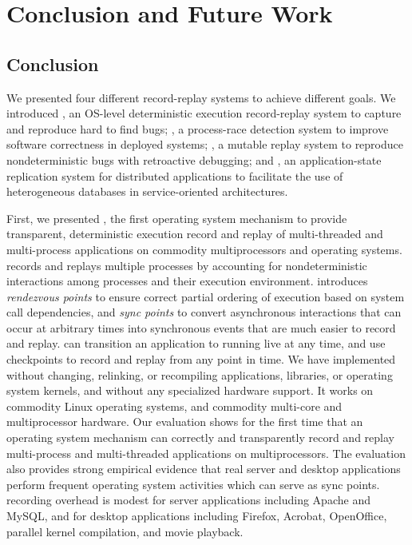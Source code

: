 \chapter{Conclusion and Future Work}
\label{ch:conclusion}

\section{Conclusion}

We presented four different record-replay systems to achieve different goals.
We introduced \scribe, an OS-level deterministic execution record-replay system
to capture and reproduce hard to find bugs; \racepro, a process-race detection
system to improve software correctness in deployed systems; \dora, a mutable
replay system to reproduce nondeterministic bugs with retroactive debugging;
and \synapse, an application-state replication system for distributed
applications to facilitate the use of heterogeneous databases in
service-oriented architectures.

First, we presented \scribe{}, the first operating system mechanism to provide
transparent, deterministic execution record and replay of multi-threaded and
multi-process applications on commodity multiprocessors and operating systems.
\scribe{} records and replays multiple processes by accounting for
nondeterministic interactions among processes and their execution environment.
\scribe{} introduces {\em rendezvous points} to ensure correct partial ordering
of execution based on system call dependencies, and {\em sync points} to convert
asynchronous interactions that can occur at arbitrary times into synchronous
events that are much easier to record and replay.  \scribe{} can transition an
application  to running live at any time, and use checkpoints to record and
replay from any point in time.
We have implemented \scribe{} without changing, relinking, or
recompiling applications, libraries, or operating system kernels, and
without any specialized hardware support. It works on commodity Linux
operating systems, and commodity multi-core and multiprocessor
hardware.  Our evaluation shows for the first time that an operating
system mechanism can correctly and transparently record and replay
multi-process and multi-threaded applications on multiprocessors.  The
evaluation also provides strong empirical evidence that 
real server and desktop applications perform frequent
operating system activities which can serve as sync points.
\scribe{} recording overhead is modest for server applications including Apache
and MySQL, and for desktop applications including Firefox, Acrobat, OpenOffice,
parallel kernel compilation, and movie playback.

